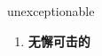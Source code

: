 
\begin{frame}
{\huge unexceptionable}
\begin{center}
\begin{enumerate}\Large
  \item \textbf{无懈可击的}
\end{enumerate}
\end{center}
\end{frame}
